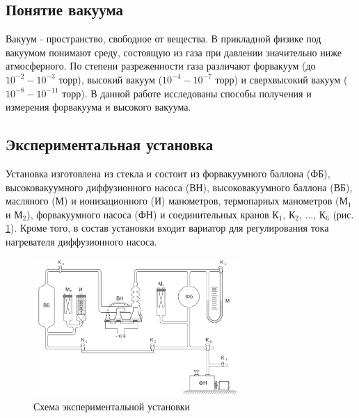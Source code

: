 \documentclass[a4paper,12pt]{article} %
\begin{document}
\subsection{Понятие вакуума}

Вакуум - пространство, свободное от вещества. В прикладной физике под вакуумом понимают среду, состоящую из газа при давлении значительно ниже атмосферного. По степени разреженности газа различают форвакуум (до $ 10^{-2} - 10^{-3}$ торр), высокий вакуум ($ 10^{-4} - 10^{-7}$ торр) и сверхвысокий вакуум ($ 10^{-8} - 10^{-11}$ торр). В данной работе исследованы способы получения и измерения форвакуума и высокого вакуума.

\subsection{Экспериментальная установка}

Установка изготовлена из стекла и состоит из форвакуумного баллона (ФБ), высоковакуумного диффузионного насоса (ВН), высоковакуумного баллона (ВБ), масляного (М) и ионизационного (И) манометров, термопарных манометров ($\text{М}_1$ и $\text{М}_2$), форвакуумного насоса (ФН) и соединительных кранов $\text{К}_1$, $\text{К}_2$, ..., $\text{К}_6$ (рис. \ref{fig:setup}). Кроме того, в состав
установки входит вариатор для регулирования тока нагревателя диффузионного насоса.

\begin{figure}
    \centering
    \includegraphics[width = 0.7\textwidth]{setup.PNG}
    \caption{Схема экспериментальной установки}
    \label{fig:setup}
\end{figure}
\end{document}
